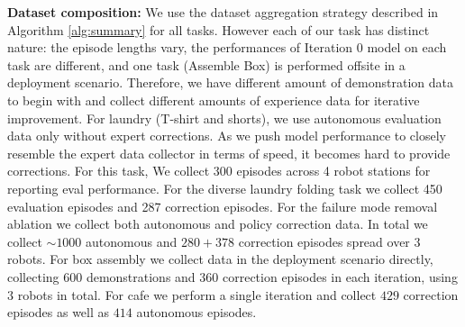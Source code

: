 \documentclass[conference]{IEEEtran}
\begin{document}
\textbf{Dataset composition:} We use the dataset aggregation strategy described in Algorithm \ref{alg:summary} for all tasks. However each of our task has distinct nature: the episode lengths vary, the performances of Iteration 0 model on each task are different, and one task (Assemble Box) is performed offsite in a deployment scenario. Therefore, we have different amount of demonstration data to begin with and collect different amounts of experience data for iterative improvement. For laundry (T-shirt and shorts), we use autonomous evaluation data only without expert corrections. As we push model performance to closely resemble the expert data collector in terms of speed, it becomes hard to provide corrections. For this task, We collect 300 episodes across 4 robot stations for reporting eval performance. For the diverse laundry folding task we collect 450 evaluation episodes and 287 correction episodes. For the failure mode removal ablation we collect both autonomous and policy correction data. In total we collect $\sim 1000$ autonomous and $280 + 378$ correction episodes spread over $3$ robots. For box assembly we collect data in the deployment scenario directly, collecting $600$ demonstrations and $360$ correction episodes in each iteration, using $3$ robots in total. For cafe we perform a single iteration and collect $429$ correction episodes as well as $414$ autonomous episodes.
\end{document}
